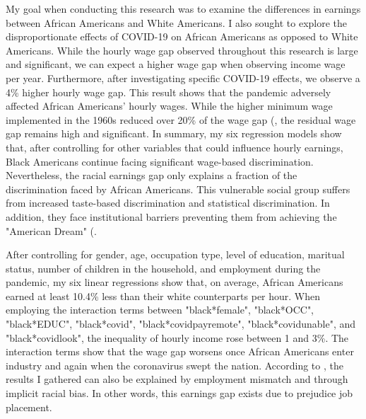 \documentclass[12pt, english]{article}
\begin{document}
My goal when conducting this research was to examine the differences in earnings between African Americans and White Americans. I also sought to explore the disproportionate effects of COVID-19 on African Americans as opposed to White Americans. While the hourly wage gap observed throughout this research is large and significant, we can expect a higher wage gap when observing income wage per year. Furthermore, after investigating specific COVID-19 effects, we observe a 4\% higher hourly wage gap. This result shows that the pandemic adversely affected African Americans' hourly wages. While the higher minimum wage implemented in the 1960s reduced over 20\% of the wage gap (\citet{DerenoncourtMontialoux2020}, the residual wage gap remains high and significant. In summary, my six regression models show that, after controlling for other variables that could influence hourly earnings, Black Americans continue facing significant wage-based discrimination. Nevertheless, the racial earnings gap only explains a fraction of the discrimination faced by African Americans. This vulnerable social group suffers from increased taste-based discrimination and statistical discrimination. In addition, they face institutional barriers preventing them from achieving the "American Dream"
(\citet{Koechlin2019}.

After controlling for gender, age, occupation type, level of education, maritual status, number of children in the household, and employment during the pandemic, my six linear regressions show that, on average, African Americans earned at least 10.4\% less than their white counterparts per hour. When employing the interaction terms between "black*female", "black*OCC", "black*EDUC", "black*covid", "black*covidpayremote", "black*covidunable", and "black*covidlook", the inequality of hourly income rose between 1 and 3\%. The interaction terms show that the wage gap worsens once African Americans enter industry and again when the coronavirus swept the nation. According to \citet{LuLi2021}, the results I gathered can also be explained by employment mismatch and through implicit racial bias. In other words, this earnings gap exists due to prejudice job placement. 
\end{document}
